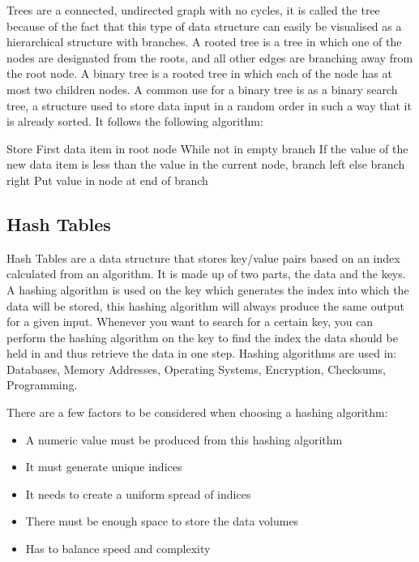   Trees are a connected, undirected graph with no cycles, it is called the tree because of the fact that this type of data structure can easily be visualised as a hierarchical structure with branches. A rooted tree is a tree in which one of the nodes are designated from the roots, and all other edges are branching away from the root node. A binary tree is a rooted tree in which each of the node has at most two children nodes. A common use for a binary tree is as a binary search tree, a structure used to store data input in a random order in such a way that it is already sorted. It follows the following algorithm:
  
  Store First data item in root node
  While not in empty branch
	  If the value of the new data item is less than the value in the current node, branch left
	  else branch right
  Put value in node at end of branch
  
\subsection{Hash Tables}
  
  Hash Tables are a data structure that stores key/value pairs based on an index calculated from an algorithm. It is made up of two parts, the data and the keys. A hashing algorithm is used on the key which generates the index into which the data will be stored, this hashing algorithm will always produce the same output for a given input. Whenever you want to search for a certain key, you can perform the hashing algorithm on the key to find the index the data should be held in and thus retrieve the data in one step. Hashing algorithms are used in: Databases, Memory Addresses, Operating Systems, Encryption, Checksums, Programming.
  
  There are a few factors to be considered when choosing a hashing algorithm:
  \begin{itemize}
  	\item A numeric value must be produced from this hashing algorithm
  	\item It must generate unique indices
  	\item It needs to create a uniform spread of indices
  	\item There must be enough space to store the data volumes
  	\item Has to balance speed and complexity
  \end{itemize}
  
